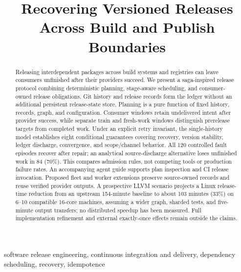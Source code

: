 \documentclass[10pt,conference]{IEEEtran}
\theoremstyle{definition}
\begin{document}
\title{Recovering Versioned Releases Across Build and Publish Boundaries}
\maketitle
\begin{abstract}
Releasing interdependent packages across build systems and registries can
leave consumers unfinished after their providers succeed. We present a
saga-inspired release protocol combining deterministic planning, stage-aware
scheduling, and consumer-owned release obligations. Git history and release
records form the ledger without an additional persistent release-state store.
Planning is a pure function of fixed history, records, graph, and configuration.
Consumer windows retain undelivered intent after provider success, while
separate train and fresh-work windows distinguish prerelease targets from
completed work. Under an explicit retry invariant, the single-history model
establishes eight conditional guarantees covering recovery, version stability,
ledger discharge, convergence, and scope/channel behavior. All 120 controlled
fault episodes recover after repair; an analytical source-discharge alternative
loses unfinished work in 84 (70\%). This compares admission rules, not competing
tools or production failure rates. An accompanying agent guide supports plan
inspection and CI release invocation. Proposed fleet and worker extensions
preserve source-owned records and reuse verified provider outputs. A prospective
LLVM scenario projects a Linux release-time reduction from an upstream
154-minute baseline to about 103 minutes (33\%) on 6--10 compatible 16-core
machines, assuming a wider graph, sharded tests, and five-minute output transfers;
no distributed speedup has been measured. Full implementation refinement and
external exactly-once effects remain outside the claims.
\end{abstract}
\begin{IEEEkeywords}
software release engineering, continuous integration and delivery,
dependency scheduling, recovery, idempotence
\end{IEEEkeywords}






\clearpage
{}

\end{document}
